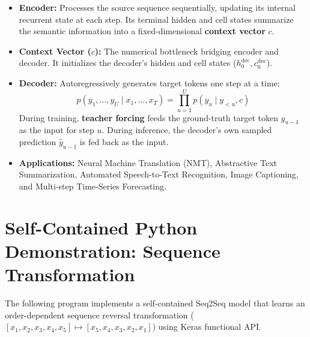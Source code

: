 \documentclass[12pt,a4paper]{article}
\begin{document}
\begin{itemize}[leftmargin=*]
\item \textbf{Encoder:} Processes the source sequence sequentially, updating its internal recurrent state at each step. Its terminal hidden and cell states summarize the semantic information into a fixed-dimensional \textbf{context vector} $c$.
\item \textbf{Context Vector ($c$):} The numerical bottleneck bridging encoder and decoder. It initializes the decoder's hidden and cell states ($h_0^{\text{dec}}, c_0^{\text{dec}}$).
\item \textbf{Decoder:} Autoregressively generates target tokens one step at a time:
\begin{equation}
p(y_1, \dots, y_U \mid x_1, \dots, x_T) = \prod_{u=1}^U p(y_u \mid y_{<u}, c)
\end{equation}
During training, \textbf{teacher forcing} feeds the ground-truth target token $y_{u-1}$ as the input for step $u$. During inference, the decoder's own sampled prediction $\hat{y}_{u-1}$ is fed back as the input.
\item \textbf{Applications:} Neural Machine Translation (NMT), Abstractive Text Summarization, Automated Speech-to-Text Recognition, Image Captioning, and Multi-step Time-Series Forecasting.
\end{itemize}

\section{Self-Contained Python Demonstration: Sequence Transformation}
The following program implements a self-contained Seq2Seq model that learns an order-dependent sequence reversal transformation ($[x_1, x_2, x_3, x_4, x_5] \mapsto [x_5, x_4, x_3, x_2, x_1]$) using Keras functional API.
\end{document}
